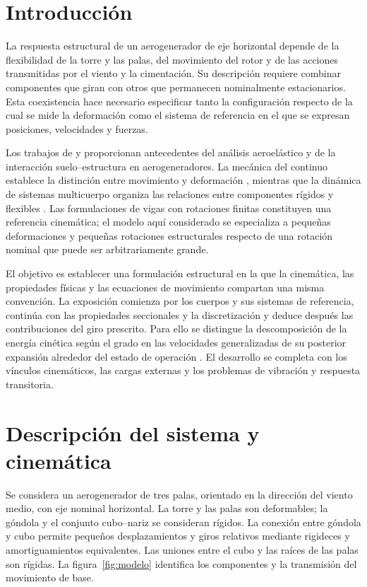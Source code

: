 \section{Introducción}
La respuesta estructural de un aerogenerador de eje horizontal depende de la flexibilidad de la torre y las palas, del movimiento del rotor y de las acciones transmitidas por el viento y la cimentación. Su descripción requiere combinar componentes que giran con otros que permanecen nominalmente estacionarios. Esta coexistencia hace necesario especificar tanto la configuración respecto de la cual se mide la deformación como el sistema de referencia en el que se expresan posiciones, velocidades y fuerzas.

Los trabajos de \citet{maza2014} y \citet{turello2023} proporcionan antecedentes del análisis aeroelástico y de la interacción suelo--estructura en aerogeneradores. La mecánica del continuo establece la distinción entre movimiento y deformación \citep{holzapfel2000}, mientras que la dinámica de sistemas multicuerpo organiza las relaciones entre componentes rígidos y flexibles \citep{shabana2013}. Las formulaciones de vigas con rotaciones finitas \citep{simo1985} constituyen una referencia cinemática; el modelo aquí considerado se especializa a pequeñas deformaciones y pequeñas rotaciones estructurales respecto de una rotación nominal que puede ser arbitrariamente grande.

El objetivo es establecer una formulación estructural en la que la cinemática, las propiedades físicas y las ecuaciones de movimiento compartan una misma convención. La exposición comienza por los cuerpos y sus sistemas de referencia, continúa con las propiedades seccionales y la discretización y deduce después las contribuciones del giro prescrito. Para ello se distingue la descomposición de la energía cinética según el grado en las velocidades generalizadas de su posterior expansión alrededor del estado de operación \citep{meirovitch1997}. El desarrollo se completa con los vínculos cinemáticos, las cargas externas y los problemas de vibración y respuesta transitoria.

\section{Descripción del sistema y cinemática}
\label{sec:cinematica}
Se considera un aerogenerador de tres palas, orientado en la dirección del viento medio, con eje nominal horizontal. La torre y las palas son deformables; la góndola y el conjunto cubo--nariz se consideran rígidos. La conexión entre góndola y cubo permite pequeños desplazamientos y giros relativos mediante rigideces y amortiguamientos equivalentes. Las uniones entre el cubo y las raíces de las palas son rígidas. La figura~\ref{fig:modelo} identifica los componentes y la transmisión del movimiento de base.

